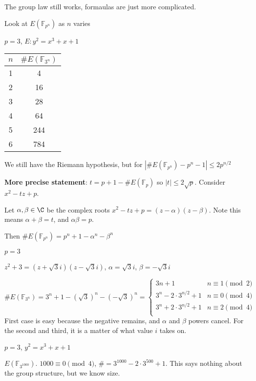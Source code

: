 \documentclass[twoside, 10pt]{article}
\newcommand{\F}{\mathbb{F}}
\begin{document}
The group law still works, formaulas are just more complicated.

Look at $E(\F_{p^n})$ as $n$ varies

\begin{exm*}
    $p = 3$, $E: y^2 = x^3 + x + 1$
\end{exm*}
\begin{tabular}{c|c}
    $n$ & $\#E(\F_{3^n})$\\
    \hline
    1 & 4\\
    2 & 16 \\
    3 & 28\\
    4 & 64\\
    5 & 244\\
    6 & 784\\
\end{tabular}

We still have the Riemann hypothesis, but for $|\#E(\F_{p^n}) - p^n - 1 | \leq 2p^{n/2}$

\textbf{More precise statement}: $t = p + 1 - \#E(\F_p)$ so $|t| \leq 2\sqrt{p}$. Consider $x^2 - tz + p$. 

Let $\alpha, \beta\in \C$ be the complex roots $x^2 - tz + p = (z - \alpha)(z - \beta)$. Note this means $\alpha + \beta = t$, and $\alpha\beta = p$. 

Then $\#E(\F_{p^n}) = p^n + 1 - \alpha^n - \beta^n$

\begin{exm*}
    $p = 3$
\end{exm*}
$z^2 + 3 = (z + \sqrt{3}i)(z - \sqrt{3}i)$, $\alpha = \sqrt{3}i$, $\beta = -\sqrt{3}i$

$\#E(\F_{3^n}) = 3^n + 1 - (\sqrt{3})^n - (-\sqrt{3})^n = \begin{cases}
    3n + 1 & n\equiv 1 \pmod{2}\\
    3^n - 2\cdot3^{n/2}+1 & n \equiv 0 \pmod{4}\\
    3^n + 2\cdot3^{n/2}+1 & n\equiv 2 \pmod{4}\\
\end{cases}$
First case is easy because the negative remains, and $\alpha$ and $\beta$ powers cancel. For the second and third, it is a matter of what value $i$ takes on.

\begin{exm*}
    $p = 3$, $y^2 = x^3 + x + 1$
\end{exm*}
$E(\F_{3^{1000}})$. $1000 \equiv 0 \pmod{4}$, $\# = 3^{1000}-2\cdot3^{500} + 1$. This says nothing about the group structure, but we know size.
\end{document}
